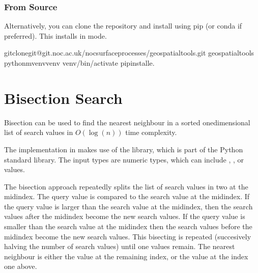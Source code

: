 \documentclass[letterpaper,10pt,english]{sphinxmanual}
\begin{document}
\subsection{From Source}
\label{\detokenize{installation:from-source}}
\sphinxAtStartPar
Alternatively, you can clone the repository and install using pip (or conda if preferred). This installs in 
mode.

\begin{sphinxVerbatim}[commandchars=\\\{\}]
gitclonegit@git.noc.ac.uk/nocsurfaceprocesses/geospatialtools.git
geospatialtools
python\PYGZhy{}mvenvvenv
venv/bin/activate
pipinstall\PYGZhy{}e.
\end{sphinxVerbatim}

\sphinxstepscope


\chapter{Bisection Search}
\label{\detokenize{bisection:bisection-search}}\label{\detokenize{bisection::doc}}
\sphinxAtStartPar
Bisection can be used to find the nearest neighbour in a sorted one\sphinxhyphen{}dimensional list of search values in
\(O(\log(n))\) time complexity.

\sphinxAtStartPar
The implementation in  makes use of the  library, which is part of the Python standard library.
The input types are numeric types, which can include , , or  values.

\sphinxAtStartPar
The bisection approach repeatedly splits the list of search values in two at the mid\sphinxhyphen{}index. The query value is compared
to the search value at the mid\sphinxhyphen{}index. If the query value is larger than the search value at the mid\sphinxhyphen{}index, then the
search values after the mid\sphinxhyphen{}index become the new search values. If the query value is smaller than the search value at
the mid\sphinxhyphen{}index then the search values before the mid\sphinxhyphen{}index become the new search values. This bisecting is repeated
(succesively halving the number of search values) until one values remain. The nearest neighbour is either the value at
the remaining index, or the value at the index one above.
\end{document}
